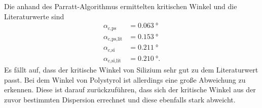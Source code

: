 Die anhand des Parratt-Algorithmus ermittelten kritischen Winkel und die Literaturwerte\cite{V44old} sind
\begin{align*}
    \alpha_\text{c,ps} &= \SI{0.063}{\degree} \\
    \alpha_\text{c,ps,lit} &= \SI{0.153}{\degree} \\
    \alpha_\text{c,si} &= \SI{0.211}{\degree} \\
    \alpha_\text{c,si,lit} &= \SI{0.210}{\degree}.
\end{align*}
Es fällt auf, dass der kritische Winkel von Silizium sehr gut zu dem Literaturwert passt.
Bei dem Winkel von Polystyrol ist allerdings eine große Abweichung zu erkennen.
Diese ist darauf zurückzuführen, dass sich der kritische Winkel aus der zuvor bestimmten Dispersion errechnet
und diese ebenfalls stark abweicht. 

\newpage
